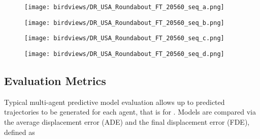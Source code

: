 \documentclass[letterpaper, 10 pt, conference]{ieeeconf}
\begin{document}
\begin{figure*}[t]
    \centering
    \begin{subfigure}[b]{0.49\columnwidth}
        \centering
        \texttt{[image: birdviews/DR\_USA\_Roundabout\_FT\_20560\_seq\_a.png]}
        \caption{}
        \label{fig:multi_pred_a}
    \end{subfigure}
    \begin{subfigure}[b]{0.49\columnwidth}
        \centering
        \texttt{[image: birdviews/DR\_USA\_Roundabout\_FT\_20560\_seq\_b.png]}
        \caption{}
        \label{fig:multi_pred_b}
    \end{subfigure}
    \begin{subfigure}[b]{0.49\columnwidth}
        \centering
        \texttt{[image: birdviews/DR\_USA\_Roundabout\_FT\_20560\_seq\_c.png]}
        \caption{}
        \label{fig:multi_pred_c}
    \end{subfigure}
    \begin{subfigure}[b]{0.49\columnwidth}
        \centering
        \texttt{[image: birdviews/DR\_USA\_Roundabout\_FT\_20560\_seq\_d.png]}
        \caption{}
        \label{fig:multi_pred_d}
    \end{subfigure}
    \caption{A sequence of 4 subsequent prediction snapshots spaced 1 second apart. For each vehicle in the scene we show 10 sampled predictions over the subsequent 3 seconds based on the previous 1 second. Notice the car that just entered the roundabout from top-right in \ref{fig:multi_pred_a}, for which ITRA predicts that it will go forward in the roundabout, and as it enters the roundabout in \ref{fig:multi_pred_c}, the prediction diversifies to include both exiting the roundabout and continuing the turn, finally matching the ground truth trajectory (in dark grey) in \ref{fig:multi_pred_d} once the car started turning.}
    \label{fig:multi_prediction}
\end{figure*}



\subsection{Evaluation Metrics} \label{sec:eval-metrics}

Typical multi-agent predictive model evaluation allows up to  predicted trajectories to be generated for each agent, that is  for . Models are compared via the average displacement error (ADE) and the final displacement error (FDE), defined as
\end{document}

